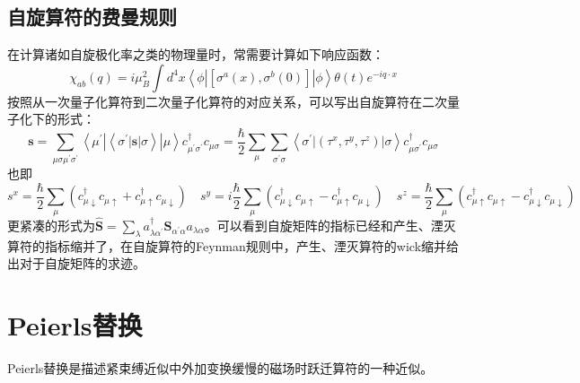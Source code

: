 \documentclass[10pt,openany]{book}
\theoremstyle{thmstyle} %
\theoremstyle{defstyle} %
\theoremstyle{prostyle} %
\begin{document}
\subsection{自旋算符的费曼规则}
在计算诸如自旋极化率之类的物理量时，常需要计算如下响应函数：
\begin{equation}
	\chi_{a b}(q)=i \mu_B^2 \int d^4 x\left\langle\phi\left|\left[\sigma^a(x), \sigma^b(0)\right]\right| \phi\right\rangle \theta(t) e^{-i q \cdot x}
\end{equation}
按照从一次量子化算符到二次量子化算符的对应关系，可以写出自旋算符在二次量子化下的形式：
\begin{equation}
	\mathbf{s}=\sum_{\mu \sigma \mu^{\prime} \sigma^{\prime}}\left\langle\mu^{\prime}\left|\left\langle\sigma^{\prime}|\mathbf{s}| \sigma\right\rangle\right| \mu\right\rangle c_{\mu^{\prime} \sigma^{\prime}}^{\dagger} c_{\mu \sigma}=\frac{\hbar}{2} \sum_\mu \sum_{\sigma^{\prime} \sigma}\left\langle\sigma^{\prime}\left|\left(\tau^x, \tau^y, \tau^z\right)\right| \sigma\right\rangle c_{\mu \sigma^{\prime}}^{\dagger} c_{\mu \sigma}
\end{equation}
也即
\begin{equation}
	s^x=\frac{\hbar}{2} \sum_\mu\left(c_{\mu \downarrow}^{\dagger} c_{\mu \uparrow}+c_{\mu \uparrow}^{\dagger} c_{\mu \downarrow}\right) \quad s^y=i \frac{\hbar}{2} \sum_\mu\left(c_{\mu \downarrow}^{\dagger} c_{\mu \uparrow}-c_{\mu \uparrow}^{\dagger} c_{\mu \downarrow}\right) \quad s^z=\frac{\hbar}{2} \sum_\mu\left(c_{\mu \uparrow}^{\dagger} c_{\mu \uparrow}-c_{\mu \downarrow}^{\dagger} c_{\mu \downarrow}\right)
\end{equation}
更紧凑的形式为$\hat{\mathbf{S}}=\sum_\lambda a_{\lambda \alpha^{\prime}}^{\dagger} \mathbf{S}_{\alpha^{\prime} \alpha} a_{\lambda \alpha}$。可以看到自旋矩阵的指标已经和产生、湮灭算符的指标缩并了，在自旋算符的Feynman规则中，产生、湮灭算符的wick缩并给出对于自旋矩阵的求迹。
\section{Peierls替换}
Peierls替换是描述紧束缚近似中外加变换缓慢的磁场时跃迁算符的一种近似。
\end{document}
